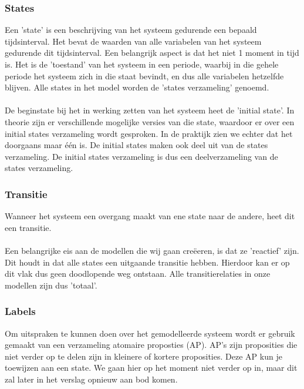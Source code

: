 \documentclass{article}
\begin{document}
    \subsubsection{States}
      Een 'state' is een beschrijving van het systeem gedurende een bepaald tijdsinterval. Het bevat de waarden van alle variabelen van het systeem gedurende dit tijdsinterval. Een belangrijk aspect is dat het niet 1 moment in tijd is. Het is de 'toestand' van het systeem in een periode, waarbij in die gehele periode het systeem zich in die staat bevindt, en dus alle variabelen hetzelfde blijven. Alle states in het model worden de 'states verzameling' genoemd.\\\\
      De beginstate bij het in werking zetten van het systeem heet de 'initial state'. In theorie zijn er verschillende mogelijke versies van die state, waardoor er over een initial states verzameling wordt gesproken. In de praktijk zien we echter dat het doorgaans maar één is. De initial states maken ook deel uit van de states verzameling. De initial states verzameling is dus een deelverzameling van de states verzameling.

    \subsubsection{Transitie}
      Wanneer het systeem een overgang maakt van ene state naar de andere, heet dit een transitie.\\\\
      Een belangrijke eis aan de modellen die wij gaan creëeren, is dat ze 'reactief' zijn. Dit houdt in dat alle states een uitgaande transitie hebben. Hierdoor kan er op dit vlak dus geen doodlopende weg ontstaan. Alle transitierelaties in onze modellen zijn dus 'totaal'.

    \subsubsection{Labels}
      Om uitspraken te kunnen doen over het gemodelleerde systeem wordt er gebruik gemaakt van een verzameling atomaire proposties (AP). AP's zijn proposities die niet verder op te delen zijn in kleinere of kortere proposities. Deze AP kun je toewijzen aan een state. We gaan hier op het moment niet verder op in, maar dit zal later in het verslag opnieuw aan bod komen.\\\\
\end{document}
